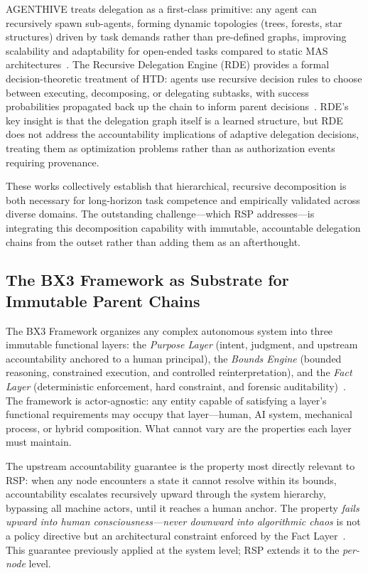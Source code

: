 AGENTHIVE treats delegation as a first-class primitive: any agent can recursively spawn sub-agents, forming dynamic topologies (trees, forests, star structures) driven by task demands rather than pre-defined graphs, improving scalability and adaptability for open-ended tasks compared to static MAS architectures~\cite{agenthive2025}. The Recursive Delegation Engine (RDE) provides a formal decision-theoretic treatment of HTD: agents use recursive decision rules to choose between executing, decomposing, or delegating subtasks, with success probabilities propagated back up the chain to inform parent decisions~\cite{rde2025}. RDE's key insight is that the delegation graph itself is a learned structure, but RDE does not address the accountability implications of adaptive delegation decisions, treating them as optimization problems rather than as authorization events requiring provenance.

These works collectively establish that hierarchical, recursive decomposition is both necessary for long-horizon task competence and empirically validated across diverse domains. The outstanding challenge---which RSP addresses---is integrating this decomposition capability with immutable, accountable delegation chains from the outset rather than adding them as an afterthought.

\subsection{The BX3 Framework as Substrate for Immutable Parent Chains}
\label{sec:bx3-substrate}

The BX3 Framework organizes any complex autonomous system into three immutable functional layers: the \emph{Purpose Layer} (intent, judgment, and upstream accountability anchored to a human principal), the \emph{Bounds Engine} (bounded reasoning, constrained execution, and controlled reinterpretation), and the \emph{Fact Layer} (deterministic enforcement, hard constraint, and forensic auditability)~\cite{bx3-framework}. The framework is actor-agnostic: any entity capable of satisfying a layer's functional requirements may occupy that layer---human, AI system, mechanical process, or hybrid composition. What cannot vary are the properties each layer must maintain.

The upstream accountability guarantee is the property most directly relevant to RSP: when any node encounters a state it cannot resolve within its bounds, accountability escalates recursively upward through the system hierarchy, bypassing all machine actors, until it reaches a human anchor. The property \emph{fails upward into human consciousness---never downward into algorithmic chaos} is not a policy directive but an architectural constraint enforced by the Fact Layer~\cite{bx3-framework}. This guarantee previously applied at the system level; RSP extends it to the \emph{per-node} level.

